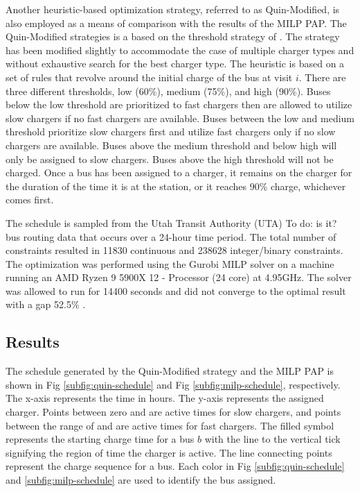 \documentclass[utf8]{FrontiersinHarvard}
\let\cite\citep                                                                 %
\newcommand{\TODO}[1]{{\color{green} To do: #1}}                                %
\newcommand{\fast}{15 }                                                         %
\newcommand{\slow}{15 }                                                         %
\newcommand{\timeran}{14400 }                                                   %
\newcommand{\gappercent}{52.5\% }                                               %
\begin{document}
Another heuristic-based optimization strategy, referred to as Quin-Modified, is also employed as a means of comparison
with the results of the MILP PAP. The Quin-Modified strategies is a based on the threshold strategy of \cite{Qin2016}.
The strategy has been modified slightly to accommodate the case of multiple charger types and without exhaustive search
for the best charger type. The heuristic is based on a set of rules that revolve around the initial charge of the bus at
visit $i$. There are three different thresholds, low (60\%), medium (75\%), and high (90\%). Buses below the low
threshold are prioritized to fast chargers then are allowed to utilize slow chargers if no fast chargers are available.
Buses between the low and medium threshold prioritize slow chargers first and utilize fast chargers only if no slow
chargers are available. Buses above the medium threshold and below high will only be assigned to slow chargers. Buses
above the high threshold will not be charged. Once a bus has been assigned to a charger, it remains on the charger for
the duration of the time it is at the station, or it reaches 90\% charge, whichever comes first.

The schedule is sampled from the Utah Transit Authority (UTA) \TODO{is it?} bus routing data that occurs over a 24-hour
time period. The total number of constraints resulted in 11830 continuous and 238628 integer/binary constraints. The
optimization was performed using the Gurobi MILP solver \cite{GurobiOptimization2021} on a machine running an AMD Ryzen
9 5900X 12 - Processor (24 core) at 4.95GHz. The solver was allowed to run for \timeran seconds and did not converge to
the optimal result with a gap \gappercent.

\subsection{Results}

The schedule generated by the Quin-Modified strategy and the MILP PAP is shown in Fig \ref{subfig:quin-schedule} and Fig
\ref{subfig:milp-schedule}, respectively. The x-axis represents the time in hours. The y-axis represents the assigned
charger. Points between zero and \fpeval{\slow - 1} are active times for slow chargers, and points between the range of
\fpeval{\slow - 1} and \fpeval{\fast + \slow - 1} are active times for fast chargers. The filled symbol represents the
starting charge time for a bus $b$ with the line to the vertical tick signifying the region of time the charger is
active. The line connecting points represent the charge sequence for a bus. Each color in Fig \ref{subfig:quin-schedule}
and \ref{subfig:milp-schedule} are used to identify the bus assigned.
\end{document}
